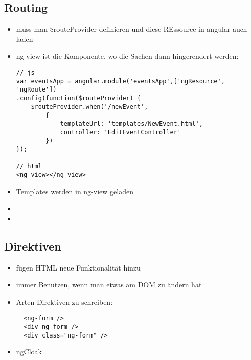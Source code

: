 \subsection{Routing}
\begin{itemize}
  \item muss man \$routeProvider definieren und diese REssource in angular auch laden
  \item ng-view ist die Komponente, wo die Sachen dann hingerendert werden:
\begin{verbatim}
// js
var eventsApp = angular.module('eventsApp',['ngResource', 'ngRoute'])
.config(function($routeProvider) {
    $routeProvider.when('/newEvent',
        {
            templateUrl: 'templates/NewEvent.html',
            controller: 'EditEventController'
        })
});

// html
<ng-view></ng-view>

\end{verbatim}

  \item Templates werden in ng-view geladen
  \item
  \item
\end{itemize}

\subsection{Direktiven}
\begin{itemize}
  \item fügen HTML neue Funktionalität hinzu
  \item immer Benutzen, wenn man etwas am DOM zu ändern hat
  \item Arten Direktiven zu schreiben:
    \begin{verbatim}
  <ng-form />
  <div ng-form />
  <div class="ng-form" />
    \end{verbatim}
  \item ngCloak
\end{itemize}


